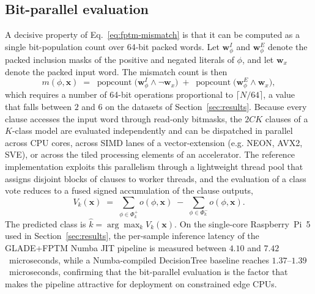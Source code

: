 \documentclass[journal,10pt]{IEEEtran}
\begin{document}
\subsection{Bit-parallel evaluation}
\label{sec:fptm-parallel}
A decisive property of Eq.~\eqref{eq:fptm-mismatch} is that it can be
computed as a single bit-population count over 64-bit packed words.
Let $\mathbf{w}^{I}_{\phi}$ and $\mathbf{w}^{E}_{\phi}$ denote the
packed inclusion masks of the positive and negated literals of
$\phi$, and let $\mathbf{w}_{x}$ denote the packed input word. The
mismatch count is then
\begin{equation}
  m(\phi,\mathbf{x})
  \;=\; \operatorname{popcount}\!\bigl(\mathbf{w}^{I}_{\phi} \wedge \neg\mathbf{w}_{x}\bigr)
  \;+\; \operatorname{popcount}\!\bigl(\mathbf{w}^{E}_{\phi} \wedge \mathbf{w}_{x}\bigr),
  \label{eq:popcount}
\end{equation}
which requires a number of 64-bit operations proportional to
$\lceil N/64 \rceil$, a value that falls between $2$ and $6$ on the
datasets of Section~\ref{sec:results}. Because every clause accesses
the input word through read-only bitmasks, the $2CK$ clauses of a
$K$-class model are evaluated independently and can be dispatched in
parallel across CPU cores, across SIMD lanes of a vector-extension
(e.g. NEON, AVX2, SVE), or across the tiled processing elements of an
accelerator. The reference implementation exploits this parallelism
through a lightweight thread pool that assigns disjoint blocks of
clauses to worker threads, and the evaluation of a class vote reduces
to a fused signed accumulation of the clause outputs,
\begin{equation}
  V_k(\mathbf{x}) \;=\;
    \sum_{\phi \in \Phi_k^{+}} o(\phi,\mathbf{x})
    \;-\; \sum_{\phi \in \Phi_k^{-}} o(\phi,\mathbf{x}).
  \label{eq:classvote}
\end{equation}
The predicted class is $\hat{k} = \arg\max_{k} V_k(\mathbf{x})$. On
the single-core Raspberry~Pi~5 used in Section~\ref{sec:results}, the
per-sample inference latency of the GLADE+FPTM Numba JIT pipeline is
measured between $4.10$ and $7.42$~microseconds, while a Numba-compiled
DecisionTree baseline reaches $1.37$--$1.39$~microseconds, confirming that
the bit-parallel evaluation is the factor that makes the pipeline attractive
for deployment on constrained edge CPUs.
\end{document}
